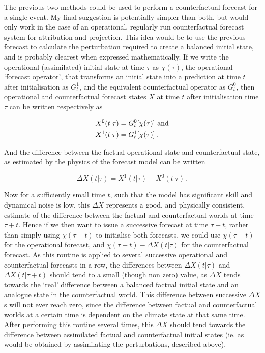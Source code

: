       The previous two methods could be used to perform a counterfactual forecast for a single event. My final suggestion is potentially simpler than both, but would only work in the case of an operational, regularly run counterfactual forecast system for attribution and projection. This idea would be to use the previous forecast to calculate the perturbation required to create a balanced initial state, and is probably clearest when expressed mathematically. If we write the operational (assimilated) initial state at time $\tau$ as $\chi(\tau)$, the operational `forecast operator', that transforms an initial state into a prediction at time $t$ after initialisation as $G_t^1$, and the equivalent counterfactual operator as $G_t^0$, then operational and counterfactual forecast states $X$ at time $t$ after initialisation time $\tau$ can be written respectively as

      \begin{align*}
        X^0(t|\tau) &= G_t^0[\chi(\tau)] \ \textnormal{and}\\
        X^1(t|\tau) &= G_t^1[\chi(\tau)]\,.
      \end{align*}

      \noindent And the difference between the factual operational state and counterfactual state, as estimated by the physics of the forecast model can be written

      \begin{equation}
        \Delta X(t|\tau) = X^1(t|\tau) - X^0(t|\tau)\,.
      \end{equation}

      \noindent Now for a sufficiently small time $t$, such that the model has significant skill and dynamical noise is low, this $\Delta X$ represents a good, and physically consistent, estimate of the difference between the factual and counterfactual worlds at time $\tau + t$. Hence if we then want to issue a successive forecast at time $\tau + t$, rather than simply using $\chi(\tau+t)$ to initialise both forecasts, we could use $\chi(\tau+t)$ for the operational forecast, and $\chi(\tau+t) - \Delta X(t|\tau)$ for the counterfactual forecast. As this routine is applied to several successive operational and counterfactual forecasts in a row, the differences between $\Delta X(t|\tau)$ and $\Delta X(t|\tau+t)$ should tend to a small (though non zero) value, as $\Delta X$ tends towards the `real' difference between a balanced factual initial state and an analogue state in the counterfactual world. This difference between successive $\Delta X$s will not ever reach zero, since the difference between factual and counterfactual worlds at a certain time is dependent on the climate state at that same time. After performing this routine several times, this $\Delta X$ should tend towards the difference between assimilated factual and counterfactual initial states (ie. as would be obtained by assimilating the perturbations, described above).

